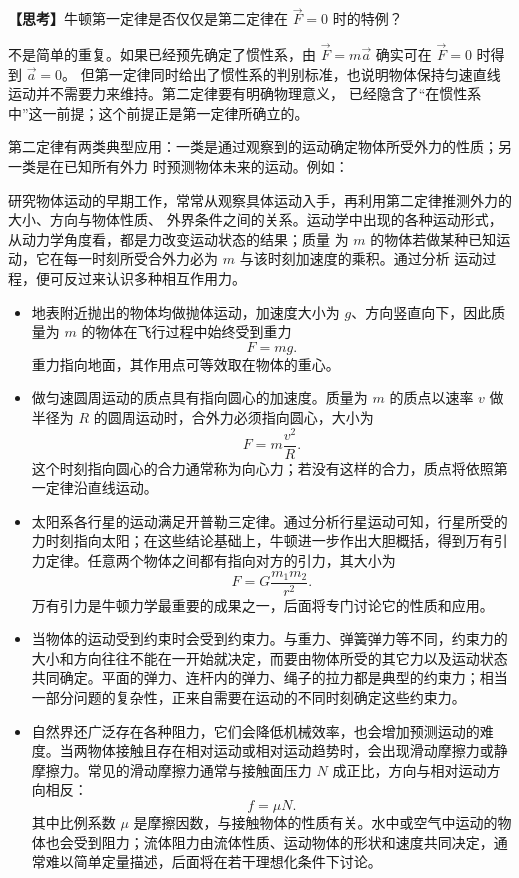 {\noindent\textbf{【思考】}牛顿第一定律是否仅仅是第二定律在 $\vec F=0$ 时的特例？

\begin{thinkanswer}
不是简单的重复。如果已经预先确定了惯性系，由 $\vec F=m\vec a$ 确实可在 $\vec F=0$ 时得到 $\vec a=0$。
但第一定律同时给出了惯性系的判别标准，也说明物体保持匀速直线运动并不需要力来维持。第二定律要有明确物理意义，
已经隐含了“在惯性系中”这一前提；这个前提正是第一定律所确立的。
\end{thinkanswer}

第二定律有两类典型应用：一类是通过观察到的运动确定物体所受外力的性质；另一类是在已知所有外力
时预测物体未来的运动。例如：

研究物体运动的早期工作，常常从观察具体运动入手，再利用第二定律推测外力的大小、方向与物体性质、
外界条件之间的关系。运动学中出现的各种运动形式，从动力学角度看，都是力改变运动状态的结果；质量
为 $m$ 的物体若做某种已知运动，它在每一时刻所受合外力必为 $m$ 与该时刻加速度的乘积。通过分析
运动过程，便可反过来认识多种相互作用力。
\begin{itemize}
  \item 地表附近抛出的物体均做抛体运动，加速度大小为 $g$、方向竖直向下，因此质量为 $m$ 的物体在飞行过程中始终受到重力
  \begin{equation}
    F=mg.
  \end{equation}
  重力指向地面，其作用点可等效取在物体的重心。
  \item 做匀速圆周运动的质点具有指向圆心的加速度。质量为 $m$ 的质点以速率 $v$ 做半径为 $R$ 的圆周运动时，合外力必须指向圆心，大小为
  \begin{equation}
    F=m\frac{v^2}{R}.
  \end{equation}
  这个时刻指向圆心的合力通常称为向心力；若没有这样的合力，质点将依照第一定律沿直线运动。
  \item 太阳系各行星的运动满足开普勒三定律。通过分析行星运动可知，行星所受的力时刻指向太阳；在这些结论基础上，牛顿进一步作出大胆概括，得到万有引力定律。任意两个物体之间都有指向对方的引力，其大小为
  \begin{equation}
    F=G\frac{m_1m_2}{r^2}.
  \end{equation}
  万有引力是牛顿力学最重要的成果之一，后面将专门讨论它的性质和应用。
  \item 当物体的运动受到约束时会受到约束力。与重力、弹簧弹力等不同，约束力的大小和方向往往不能在一开始就决定，而要由物体所受的其它力以及运动状态共同确定。平面的弹力、连杆内的弹力、绳子的拉力都是典型的约束力；相当一部分问题的复杂性，正来自需要在运动的不同时刻确定这些约束力。
  \item 自然界还广泛存在各种阻力，它们会降低机械效率，也会增加预测运动的难度。当两物体接触且存在相对运动或相对运动趋势时，会出现滑动摩擦力或静摩擦力。常见的滑动摩擦力通常与接触面压力 $N$ 成正比，方向与相对运动方向相反：
  \begin{equation}
    f=\mu N.
  \end{equation}
  其中比例系数 $\mu$ 是摩擦因数，与接触物体的性质有关。水中或空气中运动的物体也会受到阻力；流体阻力由流体性质、运动物体的形状和速度共同决定，通常难以简单定量描述，后面将在若干理想化条件下讨论。
\end{itemize}

}
